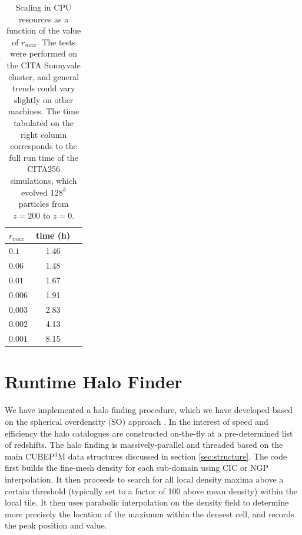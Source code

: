 \documentclass[useAMS,usenatbib]{mn2e}
\begin{document}
\begin{table}
\begin{center}
\caption{Scaling in {\small CPU} resources as a function of the value of $r_{max}$. The tests were performed 
on the CITA Sunnyvale cluster, and general trends could vary slightly on other machines. The time tabulated on the right column
corresponds to the full run time of the CITA256 simulations, which evolved $128^{3}$ particles from $z = 200$ to $z = 0$.}
\begin{tabular}{|l|c|c|}
\hline 
$r_{max}$         & time (h)   \\                 
\hline
 $0.1$ & 1.46 \\
 $0.06$ & 1.48\\
 $0.01$ & 1.67 \\
 $0.006$ & 1.91\\
 $0.003$ & 2.83 \\
 $0.002$ & 4.13\\
 $0.001$ & 8.15\\
\hline
\end{tabular}
\label{table:ra_max}
\end{center}
\end{table}



%

\section{Runtime Halo Finder}
\label{sec:halo}


We have implemented a halo finding procedure, which we have developed 
based on the spherical overdensity (SO) approach \citep{1994MNRAS.271..676L}.
In the interest of speed and efficiency the halo catalogues are constructed 
on-the-fly at a pre-determined list of redshifts. The halo finding is 
massively-parallel and threaded based on the main {\small CUBEP$^3$M} data structures 
discussed in section \ref{sec:structure}. The code first builds the 
fine-mesh density for each sub-domain using CIC or NGP interpolation. It then 
proceeds to search for all local density maxima above a certain
threshold (typically set to a factor of 100 above mean density) within the local tile. 
It then uses parabolic interpolation on the density field to determine more precisely
the location of the maximum within the densest cell, and records the peak 
position and value. %
\end{document}
